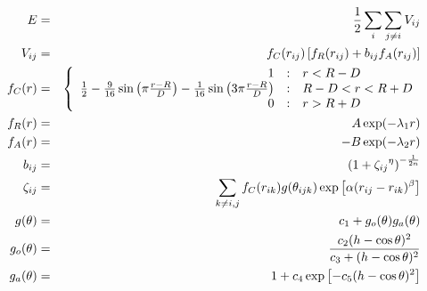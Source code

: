 \documentclass[12pt]{article}
\begin{document}
\begin{eqnarray*}
  E & = & \frac{1}{2} \sum_i \sum_{j \neq i} V_{ij} \\
  V_{ij} & = & f_C(r_{ij}) \left[ f_R(r_{ij}) + b_{ij} f_A(r_{ij}) \right] \\
  f_C(r) & = & \left\{ \begin{array} {r@{\quad:\quad}l}
    1 & r < R - D \\
    \frac{1}{2} - \frac{9}{16} \sin \left( \pi \frac{r-R}{D} \right) - \frac{1}{16} \sin \left( 3\pi \frac{r-R}{D} \right) &
      R-D < r < R + D \\
    0 & r > R + D
    \end{array} \right. \\
  f_R(r) & = & A \exp (-\lambda_1 r) \\
  f_A(r) & = & -B \exp (-\lambda_2 r) \\
  b_{ij} & = & \left( 1 + {\zeta_{ij}}^\eta \right)^{-\frac{1}{2n}} \\
  \zeta_{ij} & = & \sum_{k \neq i,j} f_C(r_{ik}) g(\theta_{ijk})
                   \exp \left[ \alpha (r_{ij} - r_{ik})^\beta \right] \\
  g(\theta) & = & c_1 + g_o(\theta) g_a(\theta) \\
  g_o(\theta) & = & \frac{c_2 (h - \cos \theta)^2}{c_3 + (h - \cos \theta)^2} \\
  g_a(\theta) & = & 1 + c_4 \exp \left[ -c_5 (h - \cos \theta)^2 \right] \\
\end{eqnarray*}
\end{document}

